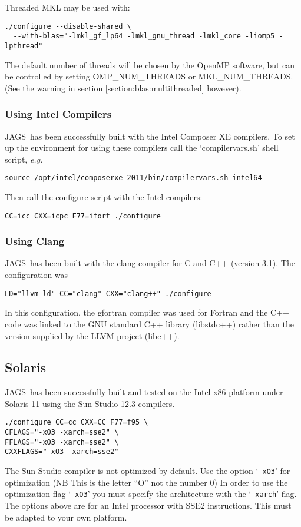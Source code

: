 \documentclass[11pt, a4paper, titlepage]{article}
\newcommand{\JAGS}{\textsf{JAGS}}
\newcommand{\code}[1]{{\bgroup{\normalfont\ttfamily #1}\egroup}}
\newcommand{\samp}[1]{{`\bgroup\normalfont\texttt{#1}'\egroup}}
\newcommand{\file}[1]{{`\normalfont\textsf{#1}'}}
\let\option=\samp
\begin{document}
Threaded MKL may be used with:
\begin{verbatim}
./configure --disable-shared \
  --with-blas="-lmkl_gf_lp64 -lmkl_gnu_thread -lmkl_core -liomp5 -lpthread"
\end{verbatim}
The default number of threads will be chosen by the OpenMP software,
but can be controlled by setting \code{OMP\_NUM\_THREADS} or
\code{MKL\_NUM\_THREADS}.  (See the warning in section
\ref{section:blas:multithreaded} however).

\subsubsection{Using Intel Compilers}

\JAGS\ has been successfully built with the Intel Composer XE
compilers. To set up the environment for using these compilers call
the \file{compilervars.sh} shell script, {\em e.g.}
\begin{verbatim}
source /opt/intel/composerxe-2011/bin/compilervars.sh intel64
\end{verbatim}
Then call the configure script with the Intel compilers:
\begin{verbatim}
CC=icc CXX=icpc F77=ifort ./configure 
\end{verbatim}

\subsubsection{Using Clang}

\JAGS\ has been built with the clang compiler for C and C++ (version 3.1).
The configuration was
\begin{verbatim}
LD="llvm-ld" CC="clang" CXX="clang++" ./configure
\end{verbatim}
In this configuration, the gfortran compiler was used for Fortran and
the C++ code was linked to the GNU standard C++ library (libstdc++)
rather than the version supplied by the LLVM project (libc++).

\subsection{Solaris}

\JAGS\ has been successfully built and tested on the Intel x86
platform under Solaris 11 using the Sun Studio 12.3 compilers.
\begin{verbatim}
./configure CC=cc CXX=CC F77=f95 \
CFLAGS="-xO3 -xarch=sse2" \
FFLAGS="-xO3 -xarch=sse2" \
CXXFLAGS="-xO3 -xarch=sse2"
\end{verbatim}
The Sun Studio compiler is not optimized by default. Use the option
\option{-xO3} for optimization (NB This is the letter ``O'' not the
number 0) In order to use the optimization flag \option{-xO3} you
must specify the architecture with the \option{-xarch} flag. The options
above are for an Intel processor with SSE2 instructions. This must be
adapted to your own platform.
\end{document}
